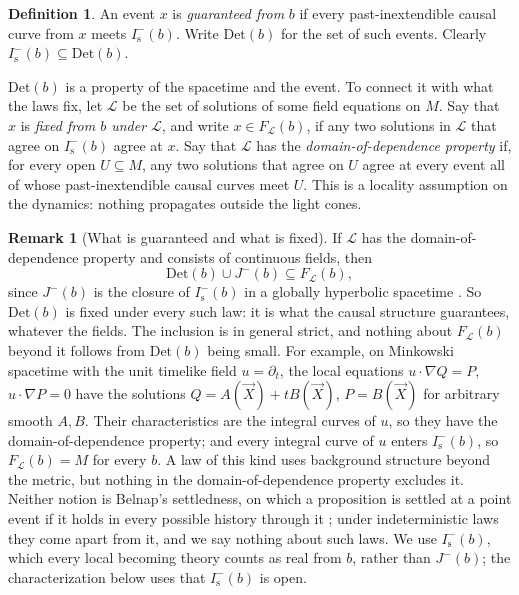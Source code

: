 \documentclass[11pt]{article}
\theoremstyle{definition}
\newtheorem{definition}[theorem]{Definition}
\newtheorem{remark}[theorem]{Remark}
\newcommand{\Is}{I^-_{\mathrm s}}
\newcommand{\Det}{\mathrm{Det}}
\begin{document}
\begin{definition}
An event $x$ is \emph{guaranteed from} $b$ if every past-inextendible causal
curve from $x$ meets $\Is(b)$. Write $\Det(b)$ for the set of such events.
Clearly $\Is(b)\subseteq\Det(b)$.
\end{definition}

$\Det(b)$ is a property of the spacetime and the event. To connect it with
what the laws fix, let $\mathcal L$ be the set of solutions of some field
equations on $M$. Say that $x$ is \emph{fixed from $b$ under $\mathcal L$},
and write $x\in F_{\mathcal L}(b)$, if any two solutions in $\mathcal L$ that
agree on $\Is(b)$ agree at $x$. Say that $\mathcal L$ has the
\emph{domain-of-dependence property} if, for every open $U\subseteq M$, any two
solutions that agree on $U$ agree at every event all of whose
past-inextendible causal curves meet $U$. This is a locality assumption on
the dynamics: nothing propagates outside the light cones.

\begin{remark}[What is guaranteed and what is fixed]\label{rem:laws}
If $\mathcal L$ has the domain-of-dependence property and consists of
continuous fields, then
\[\Det(b)\cup J^-(b)\subseteq F_{\mathcal L}(b),\]
since $J^-(b)$ is the closure of $\Is(b)$ in a globally hyperbolic spacetime
\citep{MS2008}. So $\Det(b)$ is fixed under every such law: it is what the
causal structure guarantees, whatever the fields. The inclusion is in general
strict, and nothing about $F_{\mathcal L}(b)$ beyond it follows from $\Det(b)$
being small. For example, on Minkowski spacetime with the unit timelike
field $u=\partial_t$, the local equations $u\cdot\nabla Q=P$,
$u\cdot\nabla P=0$ have the solutions $Q=A(\vec X)+tB(\vec X)$, $P=B(\vec X)$
for arbitrary smooth $A,B$. Their characteristics are the integral curves of
$u$, so they have the domain-of-dependence property; and every integral curve
of $u$ enters $\Is(b)$, so $F_{\mathcal L}(b)=M$ for every $b$. A law of this
kind uses background structure beyond the metric, but nothing in the
domain-of-dependence property excludes it. Neither notion is Belnap's
settledness, on which a proposition is settled at a point event if it holds
in every possible history through it \citep{Belnap1992}; under
indeterministic laws they come apart from it, and we say nothing about such
laws. We use $\Is(b)$, which every local becoming theory counts as real from
$b$, rather than $J^-(b)$; the characterization below uses that $\Is(b)$ is
open.
\end{remark}
\end{document}
